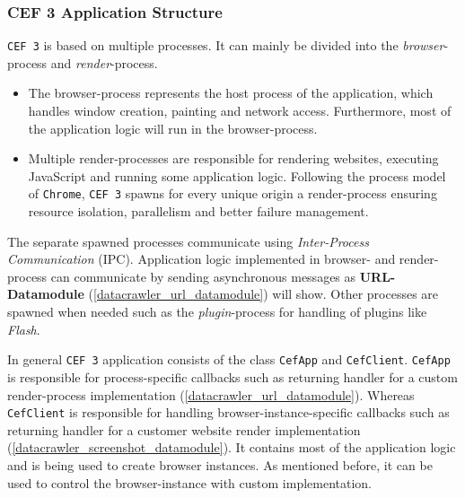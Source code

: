 \subsubsection{CEF 3 Application Structure}
\label{datacrawler_cef_architecture}
\texttt{CEF 3} is based on multiple processes. It can mainly be divided into the \textit{browser}-process and \textit{render}-process.

\begin{itemize}
\item The browser-process represents the host process of the application, which handles window creation, painting and network access. Furthermore, most of the application logic will run in the browser-process. 
\item Multiple render-processes are responsible for rendering websites, executing JavaScript and running some application logic. Following the process model of \texttt{Chrome}, \texttt{CEF 3} spawns for every unique origin a render-process ensuring resource isolation, parallelism and better failure management.
\end{itemize}

The separate spawned processes communicate using \textit{Inter-Process Communication} (IPC). Application logic implemented in browser- and render-process can communicate by sending asynchronous messages as \textbf{URL-Datamodule} (\ref{datacrawler_url_datamodule})  will show. Other processes are spawned when needed such as the \textit{plugin}-process for handling of plugins like \textit{Flash}.

In general \texttt{CEF 3} application consists of the class \texttt{CefApp} and \texttt{CefClient}. \texttt{CefApp} is responsible for process-specific callbacks such as returning handler for a custom render-process implementation (\ref{datacrawler_url_datamodule}). Whereas \texttt{CefClient} is responsible for handling browser-instance-specific callbacks such as returning handler for a customer website render implementation (\ref{datacrawler_screenshot_datamodule}). It contains most of the application logic and is being used to create browser instances. As mentioned before, it can be used to control the browser-instance with custom implementation.

